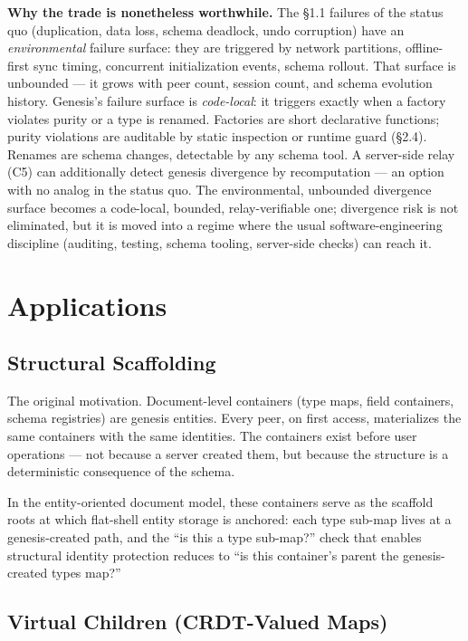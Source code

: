 \textbf{Why the trade is nonetheless worthwhile.} The \S1.1 failures of the status quo (duplication, data loss, schema deadlock, undo corruption) have an \emph{environmental} failure surface: they are triggered by network partitions, offline-first sync timing, concurrent initialization events, schema rollout. That surface is unbounded --- it grows with peer count, session count, and schema evolution history. Genesis's failure surface is \emph{code-local}: it triggers exactly when a factory violates purity or a type is renamed. Factories are short declarative functions; purity violations are auditable by static inspection or runtime guard (\S2.4). Renames are schema changes, detectable by any schema tool. A server-side relay (C5) can additionally detect genesis divergence by recomputation --- an option with no analog in the status quo. The environmental, unbounded divergence surface becomes a code-local, bounded, relay-verifiable one; divergence risk is not eliminated, but it is moved into a regime where the usual software-engineering discipline (auditing, testing, schema tooling, server-side checks) can reach it.

\section{Applications}

\subsection{Structural Scaffolding}

The original motivation. Document-level containers (type maps, field containers, schema registries) are genesis entities. Every peer, on first access, materializes the same containers with the same identities. The containers exist before user operations --- not because a server created them, but because the structure is a deterministic consequence of the schema.

In the entity-oriented document model\cite{plexus:arch}, these containers serve as the scaffold roots at which flat-shell entity storage is anchored: each type sub-map lives at a genesis-created path, and the ``is this a type sub-map?'' check that enables structural identity protection reduces to ``is this container's parent the genesis-created types map?''

\subsection{Virtual Children (CRDT-Valued Maps)}

